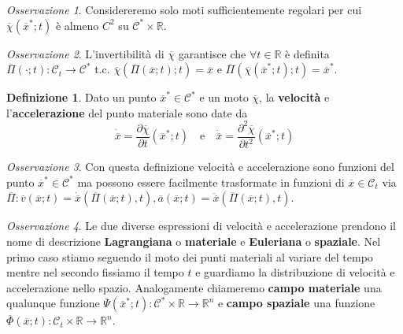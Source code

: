 \documentclass{book}
\theoremstyle{plain}
\theoremstyle{plain}
\theoremstyle{plain}
\theoremstyle{plain}
\theoremstyle{plain}
\theoremstyle{definition}
\newtheorem{defi}{Definizione}[chapter]
\theoremstyle{remark}
\newtheorem*{oss}{Osservazione}
\theoremstyle{definition}
\begin{document}
\begin{oss}
    Considereremo solo moti sufficientemente regolari per cui $\overline{\chi}(\overline{x}^*;t)$ è almeno $C^2$ su $\mathcal{C}^*\times\mathbb{R}$.
\end{oss}

\begin{oss}
    L'invertibilità di $\overline{\chi}$ garantisce che $\forall t \in \mathbb{R}$ è definita $\overline{\Pi}(\cdot;t): \mathcal{C}_t\to\mathcal{C}^*$ t.c. $\overline{\chi}(\overline{\Pi}(\overline{x};t);t)=\overline{x}$ e $\overline{\Pi}(\overline{\chi}(\overline{x}^*;t);t)=\overline{x}^*$.
\end{oss}

\begin{defi}
    Dato un punto $\overline{x}^*\in\mathcal{C}^*$ e un moto $\overline{\chi}$, la \textbf{velocità} e l'\textbf{accelerazione} del punto materiale sono date da
    \begin{displaymath}
        \dot{\overline{x}}=\dfrac{\partial \overline{\chi}}{\partial t}(\overline{x}^*;t) \quad \text{e} \quad \ddot{\overline{x}}=\dfrac{\partial^2\overline{\chi}}{\partial t^2} (\overline{x}^*;t)
    \end{displaymath}
\end{defi}

\begin{oss}
    Con questa definizione velocità e accelerazione sono funzioni del punto $\overline{x}^*\in\mathcal{C}^*$ ma possono essere facilmente trasformate in funzioni di $\overline{x}\in\mathcal{C}_t$ via $\overline{\Pi}: \overline{v}(\overline{x};t)=\dot{\overline{x}}(\overline{\Pi}(\overline{x};t),t), \overline{a}(\overline{x};t)=\ddot{\overline{x}}(\overline{\Pi}(\overline{x};t),t)$.
\end{oss}
\begin{oss}
    Le due diverse espressioni di velocità e accelerazione prendono il nome di descrizione \textbf{Lagrangiana} o \textbf{materiale} e \textbf{Euleriana} o \textbf{spaziale}. Nel primo caso stiamo seguendo il moto dei punti materiali al variare del tempo mentre nel secondo fissiamo il tempo $t$ e guardiamo la distribuzione di velocità e accelerazione nello spazio. Analogamente chiameremo \textbf{campo materiale} una qualunque funzione $\overline{\Psi}(\overline{x}^*;t):\mathcal{C}^*\times\mathbb{R}\to\mathbb{R}^n$ e \textbf{campo spaziale} una funzione $\overline{\Phi}(\overline{x};t):\mathcal{C}_t\times\mathbb{R}\to\mathbb{R}^n$.
\end{oss}
\end{document}
